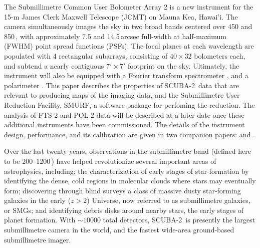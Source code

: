\documentclass[useAMS,usenatbib,nofootinbib]{mn2e}
\newcommand{\scuba}{SCUBA-2}
\begin{document}


The Submillimetre Common User Bolometer Array 2
\citep[\scuba,][]{holland2006} is a new instrument for the 15-m James
Clerk Maxwell Telescope (JCMT) on Mauna Kea, Hawai'i. The camera
simultaneously images the sky in two broad bands centered over 450 and
850\,\micron, with approximately 7.5 and 14.5\,arcsec full-width at
half-maximum (FWHM) point spread functions (PSFs). The focal planes at
each wavelength are populated with 4 rectangular subarrays, consisting
of $40 \times 32$ bolometers each, and subtend a nearly contiguous $7'
\times 7'$ footprint on the sky.  Ultimately, the instrument will also
be equipped with a Fourier transform spectrometer
\citep[FTS-2,][]{gom2010}, and a polarimeter
\cite[POL-2,][]{bastien2005}. This paper describes the properties of
\scuba\ data that are relevant to producing maps of the imaging data,
and the Submillimetre User Reduction Facility, SMURF, a software
package for perfoming the reduction. The analysis of FTS-2 and POL-2
data will be described at a later date once these additional
instruments have been commissioned. The details of the instrument
design, performance, and its calibration are given in two companion
papers: \citet{holland2012} and \citet{dempsey2012}.

Over the last twenty years, observations in the submillimetre band
(defined here to be 200--1200\,\micron) have helped revolutionize
several important areas of astrophysics, including: the
characterization of early stages of star-formation by identifying the
dense, cold regions in molecular clouds where stars may eventually
form; discovering through blind surveys a class of massive dusty
star-forming galaxies in the early ($z>2$) Universe, now referred to
as submillimetre galaxies, or SMGs; and identifying debris disks
around nearby stars, the early stages of planet formation.  With
$\sim10000$ total detectors, \scuba\ is presently the largest
submillimetre camera in the world, and the fastest wide-area
ground-based submillimetre imager.
\end{document}
